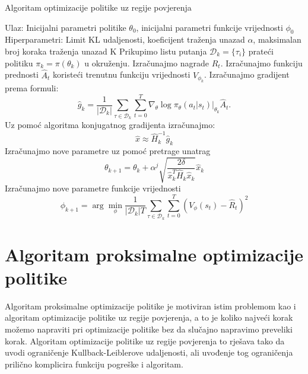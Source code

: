 \documentclass[times,utf8,diplomski]{fer}
\begin{document}
\begin{algorithm}[H]
	\caption{Algoritam optimizacije politike uz regije povjerenja}
	\label{trpo}
	\begin{algorithmic}[1]
		\STATE Ulaz:  Inicijalni parametri politike $\theta_0$, inicijalni parametri funkcije vrijednosti $\phi_0$
		\STATE Hiperparametri: Limit KL udaljenosti, koeficijent traženja unazad ${\alpha}$, maksimalan broj koraka traženja unazad K
		\STATE Prikupimo listu putanja ${\mathcal D}_k = \{\tau_i\}$ prateći politiku $\pi_k = \pi(\theta_k)$ u okruženju.
		\STATE Izračunajmo nagrade $\hat{R}_t$.
		\STATE Izračunajmo funkciju prednosti $\hat{A}_t$ koristeći trenutnu funkciju vrijednosti $V_{\phi_k}$.
		\STATE Izračunajmo gradijent prema formuli:
		\begin{equation*}
			\hat{g}_k = \frac{1}{|{\mathcal D}_k|} \sum_{\tau \in {\mathcal D}_k} \sum_{t=0}^T \left. \nabla_{\theta} \log\pi_{\theta}(a_t|s_t)\right|_{\theta_k} \hat{A}_t.
		\end{equation*}
		\STATE Uz pomoć algoritma konjugatnog gradijenta izračunajmo:
		\begin{equation*}
			\hat{x} \approx \hat{H}_k^{-1}\hat{g}_k
		\end{equation*}
		\STATE Izračunajmo nove parametre uz pomoć pretrage unatrag
		\begin{equation*}
			\theta_{k+1} = \theta_k + \alpha^j \sqrt{\frac{2 \delta}{\hat{x}_k^T \hat{H}_k \hat{x}_k}} \hat{x}_k
		\end{equation*}
		\STATE Izračunajmo nove parametre funkcije vrijednosti
		\begin{equation*}
			\phi_{k+1} = \arg \min_{\phi} \frac{1}{|{\mathcal D}_k| T} \sum_{\tau \in {\mathcal D}_k} \sum_{t=0}^T\left( V_{\phi} (s_t) - \hat{R}_t \right)^2
		\end{equation*}
		\ENDFOR
	\end{algorithmic}
\end{algorithm}

\bigskip

\section{Algoritam proksimalne optimizacije politike}

Algoritam proksimalne optimizacije politike \citep{ppo} je motiviran istim problemom kao i algoritam optimizacije politike uz regije povjerenja, a to je koliko najveći korak možemo napraviti pri optimizacije politike bez da slučajno napravimo preveliki korak. Algoritam optimizacije politike uz regije povjerenja to rješava tako da uvodi ograničenje Kullback-Leiblerove udaljenosti, ali uvođenje tog ograničenja prilično komplicira funkciju pogreške i algoritam.
\end{document}
